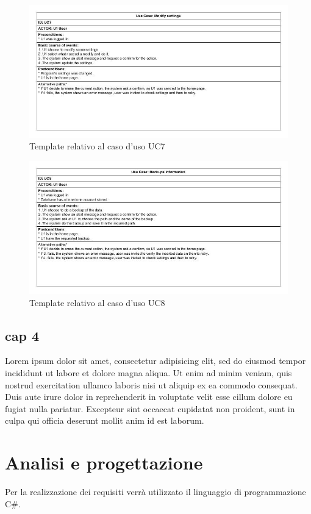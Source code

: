 \documentclass[a4paper,10pt]{report} %
\begin{document}
		\begin{figure}[htbp]
			\centering
			\includegraphics[width = \textwidth]{immagini/USE_CASE_TEMPLATE/UC07.jpg}
			\caption{Template relativo al caso d'uso UC7}
			\end{figure}
		\begin{figure}[htbp]
			\centering
			\includegraphics[width = \textwidth]{immagini/USE_CASE_TEMPLATE/UC08.jpg}
			\caption{Template relativo al caso d'uso UC8}
			\end{figure}
  \section{cap 4}
    Lorem ipsum dolor sit amet, consectetur adipisicing elit, sed do eiusmod tempor incididunt ut labore et dolore magna aliqua. Ut enim ad minim veniam, quis nostrud exercitation ullamco laboris nisi ut aliquip ex ea commodo consequat. Duis aute irure dolor in reprehenderit in voluptate velit esse cillum dolore eu fugiat nulla pariatur. Excepteur sint occaecat cupidatat non proident, sunt in culpa qui officia deserunt mollit anim id est laborum.
\newpage
\chapter{Analisi e progettazione} %
	Per la realizzazione dei requisiti verrà utilizzato il linguaggio di programmazione C#.
\end{document}
